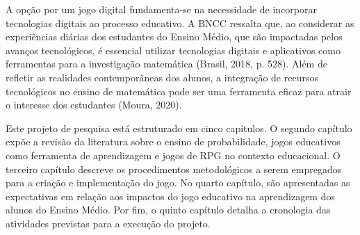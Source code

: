 A opção por um jogo digital fundamenta-se na necessidade de incorporar tecnologias digitais ao processo educativo. A BNCC ressalta que, ao considerar as experiências diárias dos estudantes do Ensino Médio, que são impactadas pelos avanços tecnológicos, é essencial utilizar tecnologias digitais e aplicativos como ferramentas para a investigação matemática (Brasil, 2018, p. 528). Além de refletir as realidades contemporâneas dos alunos, a integração de recursos tecnológicos no ensino de matemática pode ser uma ferramenta eficaz para atrair o interesse dos estudantes (Moura, 2020).

Este projeto de pesquisa está estruturado em cinco capítulos. O segundo capítulo expõe a revisão da literatura sobre o ensino de probabilidade, jogos educativos como ferramenta de aprendizagem e jogos de RPG no contexto educacional. O terceiro capítulo descreve os procedimentos metodológicos a serem empregados para a criação e implementação do jogo. No quarto capítulo, são apresentadas as expectativas em relação aos impactos do jogo educativo na aprendizagem dos alunos do Ensino Médio. Por fim, o quinto capítulo detalha a cronologia das atividades previstas para a execução do projeto.

